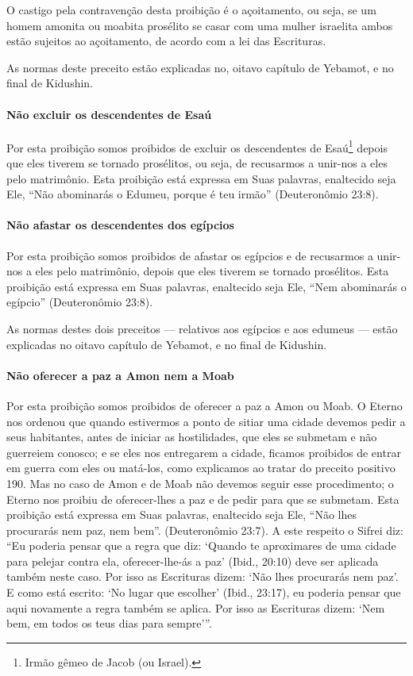 O castigo pela contravenção desta proibição é o açoitamento, ou seja,
se um homem amonita ou moabita prosélito se casar com uma mulher
israelita ambos estão sujeitos ao açoitamento, de acordo com a lei das
Escrituras.

As normas deste preceito estão explicadas no, oitavo capítulo de
Yebamot, e no final de Kidushin.


\paragraph{Não excluir os descendentes de Esaú}

Por esta proibição somos proibidos de excluir os descendentes de
Esaú\footnote{Irmão gêmeo de Jacob (ou Israel).} depois que eles tiverem se tornado
prosélitos, ou seja, de recusarmos a unir-nos a eles pelo matrimônio.
Esta proibição está expressa em Suas palavras, enaltecido seja Ele,
``Não abominarás o Edumeu, porque é teu irmão'' (Deuteronômio 23:8).

\paragraph{Não afastar os descendentes dos egípcios}

Por esta proibição somos proibidos de afastar os egípcios e de
recusarmos a unir-nos a eles pelo matrimônio, depois que eles tiverem se
tornado prosélitos. Esta proibição está expressa em Suas palavras,
enaltecido seja Ele, ``Nem abominarás o egípcio'' (Deuteronômio 23:8).

As normas destes dois preceitos --- relativos aos egípcios e aos edumeus
--- estão explicadas no oitavo capítulo de Yebamot, e no final de
Kidushin.

\paragraph{Não oferecer a paz a Amon nem a Moab}

Por esta proibição somos proibidos de oferecer a paz a Amon ou Moab. O
Eterno nos ordenou que quando estivermos a ponto de sitiar uma cidade
devemos pedir a seus habitantes, antes de iniciar as hostilidades, que
eles se submetam e não guerreiem conosco; e se eles nos entregarem a
cidade, ficamos proibidos de entrar em guerra com eles ou matá-los,
como explicamos ao tratar do preceito positivo 190. Mas no caso de Amon
e de Moab não devemos seguir esse procedimento; o Eterno nos proibiu de
oferecer-lhes a paz e de pedir para que se submetam. Esta proibição
está expressa em Suas palavras, enaltecido seja Ele, ``Não lhes
procurarás nem paz, nem bem''. (Deuteronômio 23:7). A este respeito o
Sifrei diz: ``Eu poderia pensar que a regra que diz: `Quando te
aproximares de uma cidade para pelejar contra ela, oferecer-lhe-ás a
paz' (Ibid., 20:10) deve ser aplicada também neste caso. Por isso as
Escrituras dizem: `Não lhes procurarás nem paz'. E como está escrito:
`No lugar que escolher' (Ibid., 23:17), eu poderia pensar que aqui
novamente a regra também se aplica. Por isso as Escrituras dizem: `Nem
bem, em todos os teus dias para sempre'''.

